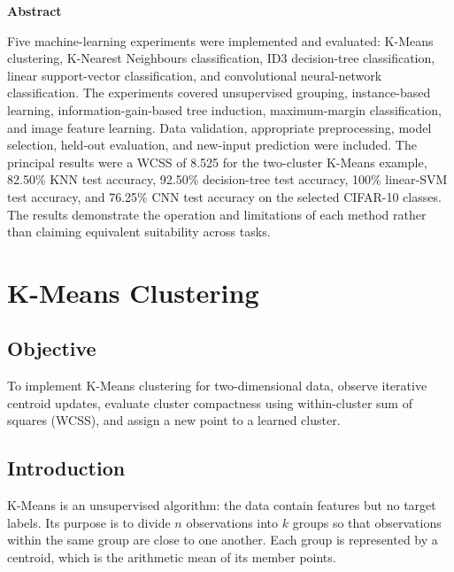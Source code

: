 \documentclass[12pt,a4paper]{report}
\newcommand{\experiment}[2]{
\chapter{#1}}
\begin{document}
\thispagestyle{plain}
\vspace*{\fill}
\begin{center}
{\LARGE\bfseries Abstract\par}
\vspace{0.5cm}
\begin{minipage}{0.85\textwidth}
\justifying
Five machine-learning experiments were implemented and evaluated: K-Means clustering, K-Nearest Neighbours classification, ID3 decision-tree classification, linear support-vector classification, and convolutional neural-network classification. The experiments covered unsupervised grouping, instance-based learning, information-gain-based tree induction, maximum-margin classification, and image feature learning. Data validation, appropriate preprocessing, model selection, held-out evaluation, and new-input prediction were included. The principal results were a WCSS of 8.525 for the two-cluster K-Means example, 82.50\% KNN test accuracy, 92.50\% decision-tree test accuracy, 100\% linear-SVM test accuracy, and 76.25\% CNN test accuracy on the selected CIFAR-10 classes. The results demonstrate the operation and limitations of each method rather than claiming equivalent suitability across tasks.
\end{minipage}
\end{center}
\vspace*{\fill}
\clearpage

\tableofcontents
\clearpage
{}

\experiment{K-Means Clustering}{01}

\section{Objective}
To implement K-Means clustering for two-dimensional data, observe iterative centroid updates, evaluate cluster compactness using within-cluster sum of squares (WCSS), and assign a new point to a learned cluster.

\section{Introduction}
K-Means is an unsupervised algorithm: the data contain features but no target labels. Its purpose is to divide $n$ observations into $k$ groups so that observations within the same group are close to one another. Each group is represented by a centroid, which is the arithmetic mean of its member points.
\end{document}
